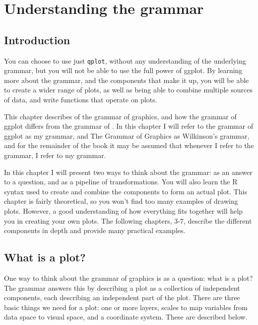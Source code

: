 


\chapter{Understanding the grammar}

\section{Introduction}\label{sec:introduction}

You can choose to use just {\tt qplot}, without any understanding of the underlying grammar, but you will not be able to use the full power of ggplot.  By learning more about the grammar, and the components that make it up, you will be able to create a wider range of plots, as well as being able to combine multiple sources of data, and write functions that operate on plots.

This chapter describes of the grammar of graphics, and how the grammar of ggplot differs from the grammar of \citep{wilkinson:2006}.  In this chapter I will refer to the grammar of ggplot as my grammar, and The Grammar of Graphics as Wilkinson's grammar, and for the remainder of the book it may be assumed that whenever I refer to the grammar, I refer to my grammar.

In this chapter I will present two ways to think about the grammar: as an answer to a question, and as a pipeline of transformations.  You will also learn the R syntax used to create and combine the components to form an actual plot. This chapter is fairly theoretical, so you won't find too many examples of drawing plots.  However, a good understanding of how everything fits together will help you in creating your own plots.   The following chapters, 3-7, describe the different components in depth and provide many practical examples.  

\section{What is a plot?}\label{sec:what_is_a_plot}

One way to think about the grammar of graphics is as a question: what is a plot?  The grammar answers this by describing a plot as a collection of independent components, each describing an independent part of the plot.  There are three basic things we need for a plot: one or more layers, scales to map variables from data space to visual space, and a coordinate system.  These are described below.

